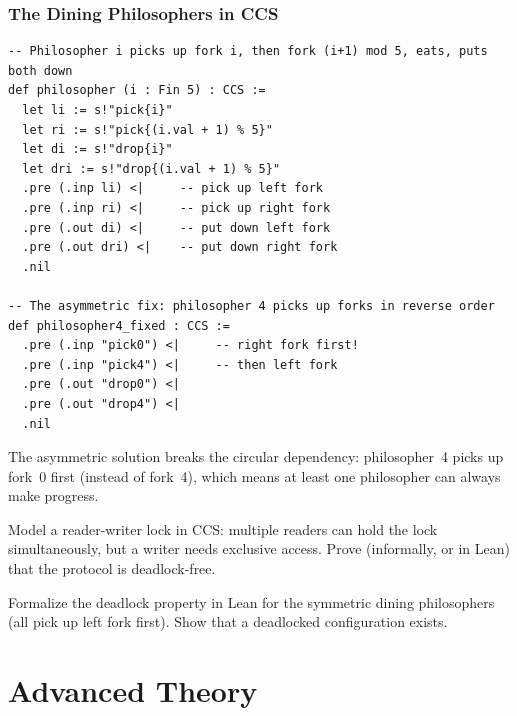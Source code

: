 \documentclass[11pt, a4paper, oneside]{book}
\newcounter{exercise}[chapter]
\begin{document}
\section{The Dining Philosophers in CCS}

\begin{leanbox}
\begin{verbatim}
-- Philosopher i picks up fork i, then fork (i+1) mod 5, eats, puts both down
def philosopher (i : Fin 5) : CCS :=
  let li := s!"pick{i}"
  let ri := s!"pick{(i.val + 1) % 5}"
  let di := s!"drop{i}"
  let dri := s!"drop{(i.val + 1) % 5}"
  .pre (.inp li) <|     -- pick up left fork
  .pre (.inp ri) <|     -- pick up right fork
  .pre (.out di) <|     -- put down left fork
  .pre (.out dri) <|    -- put down right fork
  .nil

-- The asymmetric fix: philosopher 4 picks up forks in reverse order
def philosopher4_fixed : CCS :=
  .pre (.inp "pick0") <|     -- right fork first!
  .pre (.inp "pick4") <|     -- then left fork
  .pre (.out "drop0") <|
  .pre (.out "drop4") <|
  .nil
\end{verbatim}
\end{leanbox}

The asymmetric solution breaks the circular dependency: philosopher~4 picks up
fork~0 first (instead of fork~4), which means at least one philosopher can
always make progress.

\begin{exercisebox}[title={Exercise 5.1}]
Model a reader-writer lock in CCS: multiple readers can hold the lock
simultaneously, but a writer needs exclusive access. Prove (informally, or
in Lean) that the protocol is deadlock-free.
\end{exercisebox}

\begin{exercisebox}[title={Exercise 5.2}]
Formalize the deadlock property in Lean for the symmetric dining philosophers
(all pick up left fork first). Show that a deadlocked configuration exists.
\end{exercisebox}

\part{Advanced Theory}

\end{document}
